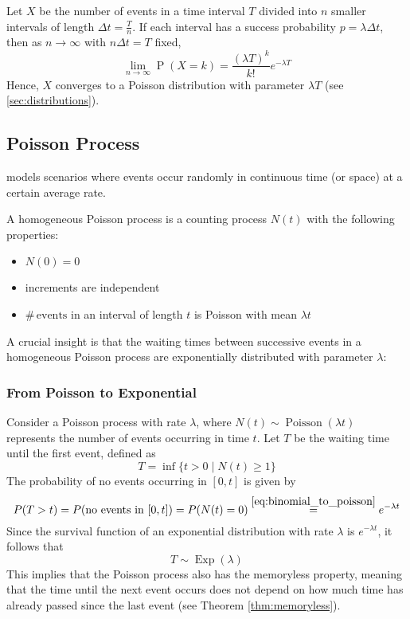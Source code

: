 \documentclass[10pt, headings=standardclasses, parskip=half, twoside]{scrartcl}
\newcommand{\Prob}{\operatorname{P}}
\newcommand{\numof}{\ensuremath{\# \,}} %
\begin{document}
\begin{theorem}\label{thm:binomial_to_poisson}
  Let \(X\) be the number of events in a time interval \(T\) divided into \(n\) smaller intervals of length \(\Delta t =\frac{T}{n}\).
  If each interval has a success probability \(p=\lambda \Delta t\), then as \(n \to \infty\) with \(n \Delta t = T\) fixed,
  \begin{equation}\label{eq:binomial_to_poisson}
  \lim_{n \to \infty} \Prob(X=k) = \frac{(\lambda T)^k}{k!} e^{-\lambda T}
  \end{equation}
  Hence, \(X\) converges to a Poisson distribution with parameter \(\lambda T\) (see \ref{sec:distributions}).
\end{theorem}



\subsection{Poisson Process}\label{subsec:poisson}
models scenarios where events occur randomly in continuous time (or space) at a certain average rate.

\begin{definition}\label{def:homogeneous_poisson}
  A homogeneous Poisson process is a counting process \(N(t)\) with the following properties:
  \begin{itemize}[before={\parskip = 0em}, nosep]
    \item \(N(0) = 0\)
    \item increments are independent
    \item \(\numof \text{events}\) in an interval of length \(t\) is Poisson with mean \(\lambda t\) \qedhere
  \end{itemize}
\end{definition}

A crucial insight is that the waiting times between successive events in a homogeneous Poisson process are exponentially distributed with parameter \(\lambda\):

\subsubsection{From Poisson to Exponential}
Consider a Poisson process with rate $\lambda$, where $N(t) \sim \operatorname{Poisson}(\lambda t)$ represents the number of events occurring in time $t$. Let $T$ be the waiting time until the first event, defined as
$$
T=\inf \{t>0 \mid N(t) \geq 1\}
$$
The probability of no events occurring in $[0, t]$ is given by
\[
P(T>t)=P(\text {no events in }[0, t])
=
P(N(t)=0)
\overset{\eqref{eq:binomial_to_poisson}}{=}
e^{-\lambda t}
\]
Since the survival function of an exponential distribution with rate $\lambda$ is $e^{-\lambda t}$, it follows that
$$
T \sim \operatorname{Exp}(\lambda) 
$$
This implies that the Poisson process also has the memoryless property, meaning that the time until the next event occurs does not depend on how much time has already passed since the last event (see Theorem \ref{thm:memoryless}).
\end{document}
